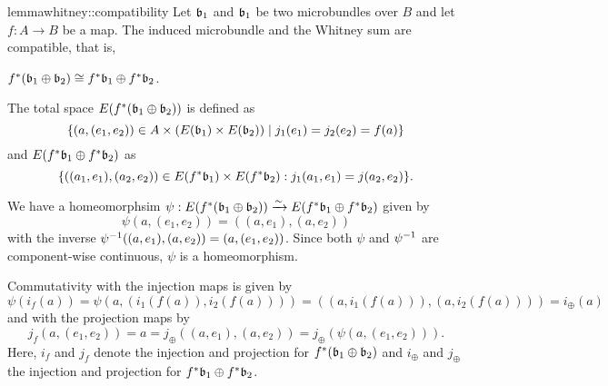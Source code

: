 \begin{scope}
\newcommand{\wleft} {
\ind{f} (\whitney{\bb_1}{\bb_2})
}
\newcommand{\wright} {
\whitney{\ind{f}\bb_1}{\ind{f}\bb_2}
}

\begin{mystatement}{lemma}{whitney::compatibility}
Let $\bb_1$ and $\bb_1$ be two microbundles over $B$ and let $f: A \to B$ be a map.
The induced microbundle and the Whitney sum are compatible, that is,
\begin{center}
$\wleft \cong \wright$.
\end{center}
\end{mystatement}

\begin{myproof}
The total space $E(\wleft)$ is defined as
\[ \{(a, (e_1, e_2)) \in A \cross (E(\bb_1) \cross E(\bb_2)) \mid j_1(e_1) = j_2(e_2) = f(a) \} \]
and $E(\wright)$ as
\[ \set{((a_1, e_1), (a_2, e_2)) \in E(\ind{f}\bb_1) \cross E(\ind{f}\bb_2)}{j_1(a_1, e_1) = j(a_2, e_2)}. \]

We have a homeomorphsim $\psi: E(\wleft) \isomto E(\wright)$ given by
\[ \psi(a, (e_1, e_2)) = ((a, e_1), (a, e_2)) \]
with the inverse $\psi^{-1}((a, e_1), (a, e_2)) = (a, (e_1, e_2))$.
Since both $\psi$ and $\psi^{-1}$ are component-wise continuous,
$\psi$ is a homeomorphism.

Commutativity with the injection maps is given by
\[ \psi(i_f(a)) = \psi(a, (i_1(f(a)), i_2(f(a)))) = ((a, i_1(f(a))), (a, i_2(f(a)))) = i_\oplus(a) \]
and with the projection maps by
\[ j_f(a, (e_1, e_2)) = a = j_\oplus((a, e_1), (a, e_2)) = j_\oplus(\psi(a, (e_1, e_2))). \]
Here, $i_f$ and $j_f$ denote the injection and projection for $\wleft$
and $i_\oplus$ and $j_\oplus$ the injection and projection for $\wright$.
\end{myproof}
\end{scope}
